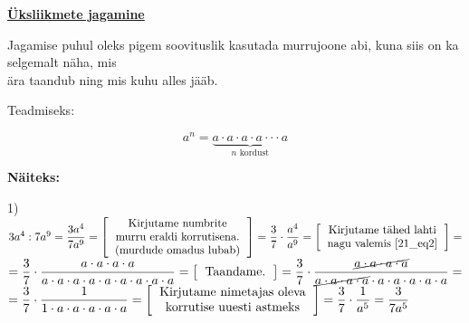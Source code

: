 \begin{center}
{{{\begin{flushleft}
\vspace{5mm}
\hspace{5mm}
\textbf{\underline{Üksliikmete jagamine}}

\vspace{2mm}
\hspace{5mm}
Jagamise puhul oleks pigem soovituslik kasutada murrujoone abi, kuna siis on ka selgemalt näha, mis\\ \hspace{5mm} ära taandub ning mis kuhu alles jääb.

\vspace{2mm}
\hspace{5mm}
Teadmiseks:

\vspace{2mm}
\hspace{5mm}
\begin{equation}
\label{21_eq2}
a^{n}=\underbrace{a\cdot a\cdot a \cdot a \cdot \cdot \cdot a}_\text{$n$ kordust}
\end{equation}


\vspace{2mm}
\hspace{5mm}
\textbf{Näiteks:}

\vspace{2mm} 
\hspace{5mm}
1) $3a^{4} : 7a^{9}=\dfrac{3a^{4}}{7a^{9}}= \left[\begin{tabular}{c}
Kirjutame numbrite\\
murru eraldi korrutisena.\\
(murdude omadus lubab)
\end{tabular} \right]=\dfrac{3}{7} \cdot \dfrac{a^{4}}{a^{9}}=\left[ \begin{tabular}{c}
Kirjutame tähed lahti\\
nagu valemis \ref{21_eq2}
\end{tabular} \right]=$\\
\vspace{5mm}
\hspace{5mm}
$=\dfrac{3}{7} \cdot \dfrac{a\cdot a \cdot a \cdot a}{a \cdot a \cdot a \cdot a \cdot a\cdot a\cdot a\cdot a\cdot a}= \left[ \begin{tabular}{c}
Taandame.
\end{tabular} \right]= \dfrac{3}{7} \cdot \dfrac{\cancel{a\cdot a \cdot a \cdot a}}{\cancel{a \cdot a \cdot a \cdot a} \cdot a\cdot a\cdot a\cdot a\cdot a}=$\\
\vspace{5mm}
\hspace{5mm}
$=\dfrac{3}{7} \cdot \dfrac{1}{1 \cdot a\cdot a\cdot a\cdot a\cdot a}= \left[\begin{tabular}{c}
Kirjutame nimetajas oleva\\
korrutise uuesti astmeks
\end{tabular} \right]=\dfrac{3}{7} \cdot \dfrac{1}{a^{5}}=\dfrac{3}{7 a^{5}}$


\end{flushleft}}}}
\end{center}
